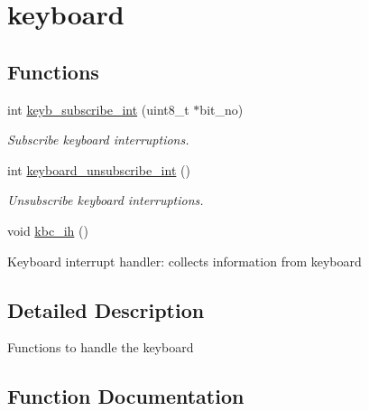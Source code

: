 \hypertarget{group__keyboard}{}\section{keyboard}
\label{group__keyboard}
\subsection*{Functions}
\begin{DoxyCompactItemize}
\item 
int \mbox{\hyperlink{group__keyboard_gaa8e63a9750dae94729779940343f0150}{keyb\+\_\+subscribe\+\_\+int}} (uint8\+\_\+t $\ast$bit\+\_\+no)
\begin{DoxyCompactList}\small\item\em Subscribe keyboard interruptions. \end{DoxyCompactList}\item 
int \mbox{\hyperlink{group__keyboard_gac95aea27a5e91b363b876fed881f368f}{keyboard\+\_\+unsubscribe\+\_\+int}} ()
\begin{DoxyCompactList}\small\item\em Unsubscribe keyboard interruptions. \end{DoxyCompactList}\item 
void \mbox{\hyperlink{group__keyboard_gab9e6ed7960d60aa4834f2038247d4536}{kbc\+\_\+ih}} ()
\begin{DoxyCompactList}\small\item\em 
\begin{DoxyItemize}
\item Keyboard interrupt handler\+: collects information from keyboard 
\end{DoxyItemize}\end{DoxyCompactList}\end{DoxyCompactItemize}


\subsection{Detailed Description}
Functions to handle the keyboard 

\subsection{Function Documentation}
\mbox{\label{group__keyboard_gab9e6ed7960d60aa4834f2038247d4536}} 
